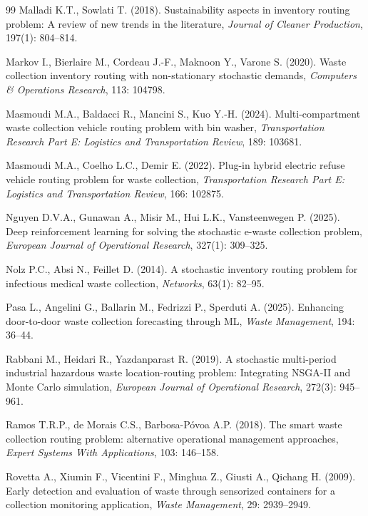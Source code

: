 \documentclass[authoryear,preprint,12pt]{elsarticle}
\begin{document}
\begin{thebibliography}{99}
Malladi K.T., Sowlati T. (2018). Sustainability aspects in inventory routing problem: A review of new trends in the literature, \textit{Journal of Cleaner Production}, 197(1): 804--814.

Markov I., Bierlaire M., Cordeau J.-F., Maknoon Y., Varone S. (2020). Waste collection inventory routing with non-stationary stochastic demands, \textit{Computers \& Operations Research}, 113: 104798. 

Masmoudi M.A.,  Baldacci R., Mancini S., Kuo Y.-H. (2024). Multi-compartment waste collection vehicle routing problem with bin washer,  \textit{Transportation Research Part E: Logistics and Transportation Review}, 189: 103681.

Masmoudi M.A., Coelho L.C., Demir E. (2022). Plug-in hybrid electric refuse vehicle routing problem for waste collection,  \textit{Transportation Research Part E: Logistics and Transportation Review}, 166: 102875.

Nguyen D.V.A., Gunawan A., Misir M., Hui L.K., Vansteenwegen P. (2025). Deep reinforcement learning for solving the stochastic e-waste collection problem, \textit{European Journal of Operational Research}, 327(1): 309--325. 

Nolz P.C., Absi N., Feillet D. (2014). A stochastic inventory routing problem for infectious medical waste collection, \textit{Networks}, 63(1): 82--95.

Pasa L., Angelini G., Ballarin M., Fedrizzi P., Sperduti A. (2025). Enhancing door-to-door waste collection forecasting through ML, \textit{Waste Management},
194: 36--44.

Rabbani M., Heidari R., Yazdanparast R. (2019). A stochastic multi-period industrial hazardous waste location-routing problem: Integrating NSGA-II and Monte Carlo simulation, \textit{European Journal of Operational Research}, 272(3): 945--961.

Ramos T.R.P., de Morais C.S., Barbosa-Póvoa A.P. (2018). The smart waste collection routing problem: alternative operational management approaches, \textit{Expert Systems With Applications}, 103: 146--158.

Rovetta A., Xiumin F., Vicentini F., Minghua Z., Giusti A., Qichang H. (2009). Early detection and evaluation of waste through sensorized containers
for a collection monitoring application, \textit{Waste Management}, 29: 2939--2949.


\end{thebibliography}
\end{document}
